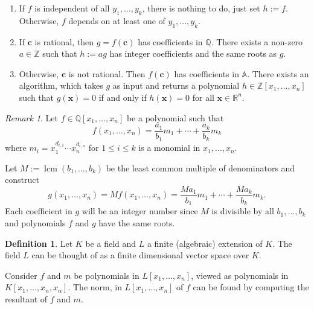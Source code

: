 \documentclass[
]{book}
\theoremstyle{definition}
\newtheorem{definition}{Definition}[chapter]
\theoremstyle{definition}
\theoremstyle{definition}
\theoremstyle{definition}
\theoremstyle{remark}
\newtheorem*{remark}{Remark}
\begin{document}
\begin{enumerate}
\def\labelenumi{\arabic{enumi}.}
\item
  If \(f\) is independent of all \(y_1,\ldots,y_k\), there is nothing to do, just set \(h := f\). Otherwise, \(f\) depends on at least one of \(y_1,\ldots,y_k\).
\item
  If \(\mathbf{c}\) is rational, then \(g = f(\mathbf{c})\) has coefficients in \(\mathbb{Q}\). There exists a non-zero \(a \in \mathbb{Z}\) such that \(h := a g\) has integer coefficients and the same roots as \(g\).
\item
  Otherwise, \(\mathbf{c}\) is not rational. Then \(f(\mathbf{c})\) has coefficients in \(\mathbb{A}\). There exists an algorithm, which takes \(g\) as input and returns a polynomial \(h \in \mathbb{Z}[x_1,\ldots,x_n]\) such that \(g(\mathbf{x}) = 0\) if and only if \(h(\mathbf{x}) = 0\) for all \(\mathbf{x} \in \mathbb{R}^n\).
\end{enumerate}

\begin{remark}
Let \(f \in \mathbb{Q}[x_1,\ldots,x_n]\) be a polynomial such that
\[
f(x_1,\ldots,x_n) = \dfrac{a_1}{b_1} m_1 + \cdots + \dfrac{a_k}{b_k} m_k
\]
where \(m_i = x_1^{d_{i,1}} \cdots x_n^{d_{i,n}}\) for \(1 \le i \le k\) is a monomial in \(x_1,\ldots,x_n\).

Let \(M := \operatorname{lcm}(b_1, \ldots, b_k)\) be the least common multiple of denominators and construct
\[
g(x_1,\ldots,x_n) = M f(x_1,\ldots,x_n) = \dfrac{M a_1}{b_1} m_1 + \cdots + \dfrac{M a_k}{b_k} m_k.
\]
Each coefficient in \(g\) will be an integer number since \(M\) is divisible by all \(b_1,\ldots,b_k\) and polynomials \(f\) and \(g\) have the same roots.
\end{remark}

\begin{definition}
\protect\hypertarget{def:norm}{}\label{def:norm}Let \(K\) be a field and \(L\) a finite (algebraic) extension of \(K\).
The field \(L\) can be thought of as a finite dimensional vector space over \(K\).

Consider \(f\) and \(m\) be polynomials in \(L[x_1,\ldots,x_n]\), viewed as polynomials in \(K[x_1,\ldots,x_n,x_\alpha]\).
The norm, in \(L[x_1,\ldots,x_n]\) of \(f\) can be found by computing the resultant of \(f\) and \(m\).
\end{definition}
\end{document}
